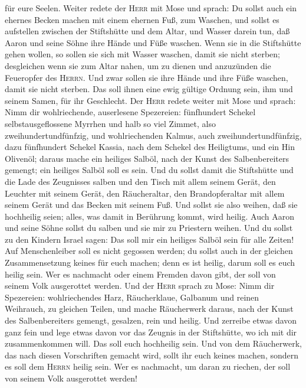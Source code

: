für eure Seelen.  Weiter redete der \textsc{Herr} mit
Mose und sprach:  Du sollst auch ein ehernes Becken
machen mit einem ehernen Fuß, zum Waschen, und sollst es aufstellen
zwischen der Stiftshütte und dem Altar, und Wasser darein tun,
 daß Aaron und seine Söhne ihre Hände und Füße waschen.
 Wenn sie in die Stiftshütte gehen wollen, so sollen sie
sich mit Wasser waschen, damit sie nicht sterben; desgleichen wenn sie
zum Altar nahen, um zu dienen und anzuzünden die Feueropfer des
\textsc{Herrn}.  Und zwar sollen sie ihre Hände und ihre
Füße waschen, damit sie nicht sterben. Das soll ihnen eine ewig gültige
Ordnung sein, ihm und seinem Samen, für ihr Geschlecht. 
Der \textsc{Herr} redete weiter mit Mose und sprach: 
Nimm dir wohlriechende, auserlesene Spezereien: fünfhundert Schekel
selbstausgeflossene Myrrhen und halb so viel Zimmet, also
zweihundertundfünfzig, und wohlriechenden Kalmus, auch
zweihundertundfünfzig,  dazu fünfhundert Schekel Kassia,
nach dem Schekel des Heiligtums, und ein Hin Olivenöl; daraus mache ein
heiliges Salböl,  nach der Kunst des Salbenbereiters
gemengt; ein heiliges Salböl soll es sein.  Und du sollst
damit die Stiftshütte und die Lade des Zeugnisses salben 
und den Tisch mit allem seinem Gerät, den Leuchter mit seinem Gerät, den
Räucheraltar,  den Brandopferaltar mit allem seinem Gerät
und das Becken mit seinem Fuß.  Und sollst sie also
weihen, daß sie hochheilig seien; alles, was damit in Berührung kommt,
wird heilig.  Auch Aaron und seine Söhne sollst du salben
und sie mir zu Priestern weihen.  Und du sollst zu den
Kindern Israel sagen: Das soll mir ein heiliges Salböl sein für alle
Zeiten!  Auf Menschenleiber soll es nicht gegossen
werden; du sollst auch in der gleichen Zusammensetzung keines für euch
machen; denn es ist heilig, darum soll es euch heilig sein.
 Wer es nachmacht oder einem Fremden davon gibt, der soll
von seinem Volk ausgerottet werden.  Und der
\textsc{Herr} sprach zu Mose: Nimm dir Spezereien: wohlriechendes Harz,
Räucherklaue, Galbanum und reinen Weihrauch, zu gleichen Teilen,
 und mache Räucherwerk daraus, nach der Kunst des
Salbenbereiters gemengt, gesalzen, rein und heilig.  Und
zerreibe etwas davon ganz fein und lege etwas davon vor das Zeugnis in
der Stiftshütte, wo ich mit dir zusammenkommen will. Das soll euch
hochheilig sein.  Und von dem Räucherwerk, das nach
diesen Vorschriften gemacht wird, sollt ihr euch keines machen, sondern
es soll dem \textsc{Herrn} heilig sein.  Wer es
nachmacht, um daran zu riechen, der soll von seinem Volk ausgerottet
werden!


